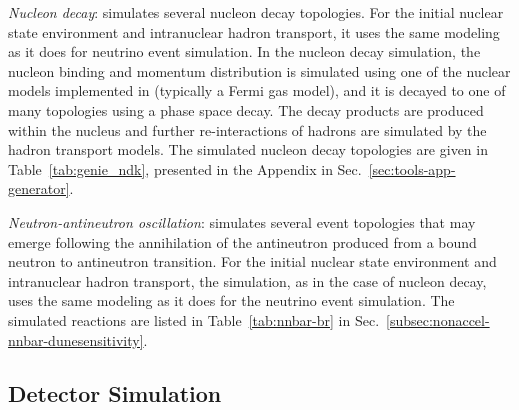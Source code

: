 \textit{Nucleon decay}:  simulates several nucleon decay topologies. For the initial nuclear state environment and intranuclear hadron transport, it uses the same modeling as it does for neutrino event simulation. In the nucleon decay simulation, the nucleon binding and momentum distribution is simulated using one of the nuclear models implemented in  (typically a Fermi gas model), and it is decayed to one of many topologies using a phase space decay. The decay products are produced within the nucleus and further re-interactions of hadrons are simulated by the  hadron transport models. The simulated nucleon decay topologies are given in Table~\ref{tab:genie_ndk}, presented in the Appendix
in Sec.~\ref{sec:tools-app-generator}.

\textit{Neutron-antineutron oscillation}:  simulates several event topologies that may emerge following the annihilation of the antineutron produced from a bound neutron to antineutron transition. For the initial nuclear state environment and intranuclear hadron transport, the simulation, as in the case of nucleon decay, uses the same modeling as it does for the neutrino event simulation. The simulated reactions are listed in Table~\ref{tab:nnbar-br} in 
Sec.~\ref{subsec:nonaccel-nnbar-dunesensitivity}.


\subsection{Detector Simulation}
\label{sec:tools-mc-detsim}


